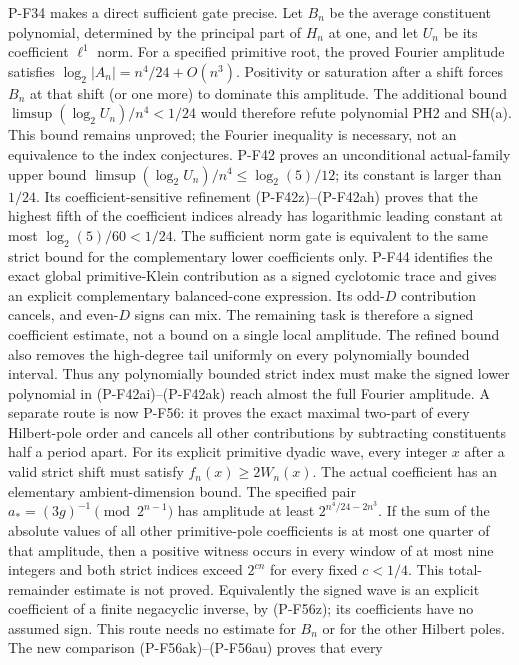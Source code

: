 \documentclass[11pt,a4paper]{article}
\begin{document}
\begin{description}
P-F34 makes a direct sufficient gate precise. Let $B_n$ be the
average constituent polynomial, determined by the principal part
of $H_n$ at one, and let $U_n$ be its coefficient $\ell^1$ norm.
For a specified primitive root, the proved Fourier amplitude satisfies
$\log_2|A_n|=n^4/24+O(n^3)$. Positivity or saturation
after a shift forces $B_n$ at that shift (or one more) to dominate
this amplitude. The additional bound
$\limsup (\log_2 U_n)/n^4<1/24$ would therefore refute polynomial
PH2 and SH(a). This bound remains unproved; the Fourier inequality
is necessary, not an equivalence to the index conjectures.
P-F42 proves an unconditional actual-family upper bound
$\limsup(\log_2 U_n)/n^4\le\log_2(5)/12$; its constant
is larger than $1/24$. Its coefficient-sensitive refinement
(P-F42z)--(P-F42ah) proves that the highest fifth of the
coefficient indices already has logarithmic leading constant
at most $\log_2(5)/60<1/24$. The sufficient norm gate is
equivalent to the same strict bound for the complementary
lower coefficients only. P-F44 identifies the exact global
primitive-Klein contribution as a signed cyclotomic trace and
gives an explicit complementary balanced-cone expression.
Its odd-$D$ contribution cancels, and even-$D$ signs can mix.
The remaining task is therefore a signed coefficient estimate,
not a bound on a single local amplitude.
The refined bound also removes the high-degree tail uniformly
on every polynomially bounded interval. Thus any polynomially
bounded strict index must make the signed lower polynomial in
(P-F42ai)--(P-F42ak) reach almost the full Fourier amplitude.
A separate route is now P-F56: it proves the exact
maximal two-part of every Hilbert-pole order and cancels all other
contributions by subtracting constituents half a period apart.
For its explicit primitive dyadic wave, every integer $x$ after a
valid strict shift must satisfy $f_n(x)\ge2W_n(x)$.
The actual coefficient has an elementary ambient-dimension bound.
The specified pair $a_*=(3g)^{-1}\pmod{2^{n-1}}$ has amplitude
at least $2^{n^4/24-2n^3}$. If the sum of the absolute values of
all other primitive-pole coefficients is at most one quarter of
that amplitude, then a positive witness occurs in every window
of at most nine integers and both strict indices exceed
$2^{cn}$ for every fixed $c<1/4$. This total-remainder estimate
is not proved. Equivalently the signed wave is an explicit
coefficient of a finite negacyclic inverse, by (P-F56z);
its coefficients have no assumed sign. This route needs no
estimate for $B_n$ or for the other Hilbert poles.
The new comparison (P-F56ak)--(P-F56au) proves that every

\end{description}
\end{document}
